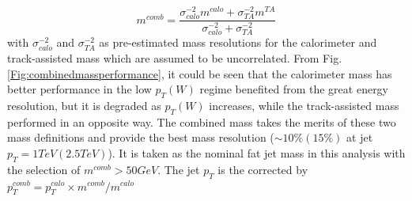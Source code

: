 \begin{equation}
m^{comb} = \frac{\sigma_{{calo}}^{-2} m^{{calo}} + \sigma_{{TA}}^{-2} m^{{TA}} }{\sigma_{{calo}}^{-2} + \sigma_{{TA}}^{-2}}
\end{equation}
with $\sigma_{{calo}}^{-2}$ and $\sigma_{{TA}}^{-2}$ as pre-estimated mass resolutions for  the calorimeter and track-assisted mass which are assumed to be uncorrelated. From Fig. \ref{Fig:combinedmassperformance}, it could be seen that the calorimeter mass has better performance in the low $p_{T}(W)$ regime benefited from the great energy resolution, but it is degraded as $p_{T}(W)$ increases, while the track-assisted mass performed in an opposite way. The combined mass takes the merits of these two mass definitions and provide the best mass resolution ($\sim10\% (15\%)$ at jet $p_{T}=1TeV(2.5TeV)$). It is taken as the nominal fat jet mass in this analysis with the selection of $m^{comb}>50GeV$. The jet $p_{T}$ is the corrected by $p_{T}^{comb}=p_{T}^{calo}\times m^{comb}/m^{calo}$ 

